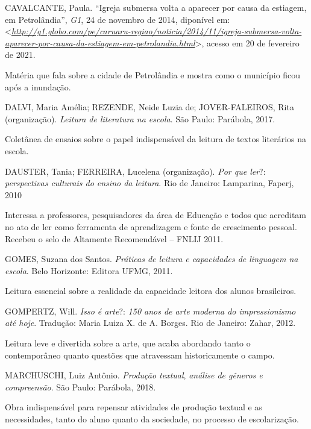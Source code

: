 \documentclass{extarticle}
\begin{document}
    CAVALCANTE, Paula. ``Igreja submersa volta a aparecer por causa da
    estiagem, em Petrolândia'', \emph{G1}, 24 de novembro de 2014,
    diponível em:
    \textless{}\href{http://g1.globo.com/pe/caruaru-regiao/noticia/2014/11/igreja-submersa-volta-aparecer-por-causa-da-estiagem-em-petrolandia.html}{\emph{http://g1.globo.com/pe/caruaru-regiao/noticia/2014/11/igreja-submersa-volta-aparecer-por-causa-da-estiagem-em-petrolandia.html}}\textgreater{},
    acesso em 20 de fevereiro de 2021.

    Matéria que fala sobre a cidade de Petrolândia e mostra como o
    município ficou após a inundação.

    DALVI, Maria Amélia; REZENDE, Neide Luzia de; JOVER-FALEIROS, Rita
    (organização). \emph{Leitura de literatura na escola}. São Paulo:
    Parábola, 2017.

    Coletânea de ensaios sobre o papel indispensável da leitura de
    textos literários na escola.

    DAUSTER, Tania; FERREIRA, Lucelena (organização). \emph{Por que
    ler}?: \emph{perspectivas culturais do ensino da leitura}. Rio de
    Janeiro: Lamparina, Faperj, 2010

    Interessa a professores, pesquisadores da área de Educação e todos
    que acreditam no ato de ler como ferramenta de aprendizagem e fonte
    de crescimento pessoal. Recebeu o selo de Altamente Recomendável --
    FNLIJ 2011.

    GOMES, Suzana dos Santos. \emph{Práticas de leitura e capacidades de
    linguagem na escola}. Belo Horizonte: Editora UFMG, 2011.

    Leitura essencial sobre a realidade da capacidade leitora dos alunos
    brasileiros.

    GOMPERTZ, Will. \emph{Isso é arte}?: \emph{150 anos de arte moderna
    do impressionismo até hoje}. Tradução: Maria Luiza X. de A. Borges.
    Rio de Janeiro: Zahar, 2012.

    Leitura leve e divertida sobre a arte, que acaba abordando tanto o
    contemporâneo quanto questões que atravessam historicamente o campo.

    MARCHUSCHI, Luiz Antônio\textsc{.} \emph{Produção textual},
    \emph{análise de gêneros e compreensão}. São Paulo: Parábola, 2018.

    Obra indispensável para repensar atividades de produção textual e as
    necessidades, tanto do aluno quanto da sociedade, no processo de
    escolarização.
\end{document}
